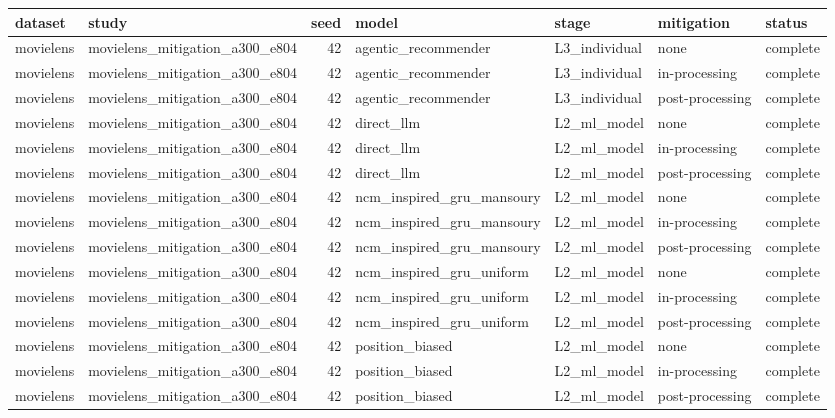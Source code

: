 \begin{table}[htbp!]
\centering
\small
\setlength{\tabcolsep}{3pt}
\renewcommand{\arraystretch}{1.1}
\begin{tabular}{llrllll}
\hline
dataset & study & seed & model & stage & mitigation & status \\
\hline
movielens & movielens\_mitigation\_a300\_e804 & 42 & agentic\_recommender & L3\_individual & none & complete \\
movielens & movielens\_mitigation\_a300\_e804 & 42 & agentic\_recommender & L3\_individual & in-processing & complete \\
movielens & movielens\_mitigation\_a300\_e804 & 42 & agentic\_recommender & L3\_individual & post-processing & complete \\
movielens & movielens\_mitigation\_a300\_e804 & 42 & direct\_llm & L2\_ml\_model & none & complete \\
movielens & movielens\_mitigation\_a300\_e804 & 42 & direct\_llm & L2\_ml\_model & in-processing & complete \\
movielens & movielens\_mitigation\_a300\_e804 & 42 & direct\_llm & L2\_ml\_model & post-processing & complete \\
movielens & movielens\_mitigation\_a300\_e804 & 42 & ncm\_inspired\_gru\_mansoury & L2\_ml\_model & none & complete \\
movielens & movielens\_mitigation\_a300\_e804 & 42 & ncm\_inspired\_gru\_mansoury & L2\_ml\_model & in-processing & complete \\
movielens & movielens\_mitigation\_a300\_e804 & 42 & ncm\_inspired\_gru\_mansoury & L2\_ml\_model & post-processing & complete \\
movielens & movielens\_mitigation\_a300\_e804 & 42 & ncm\_inspired\_gru\_uniform & L2\_ml\_model & none & complete \\
movielens & movielens\_mitigation\_a300\_e804 & 42 & ncm\_inspired\_gru\_uniform & L2\_ml\_model & in-processing & complete \\
movielens & movielens\_mitigation\_a300\_e804 & 42 & ncm\_inspired\_gru\_uniform & L2\_ml\_model & post-processing & complete \\
movielens & movielens\_mitigation\_a300\_e804 & 42 & position\_biased & L2\_ml\_model & none & complete \\
movielens & movielens\_mitigation\_a300\_e804 & 42 & position\_biased & L2\_ml\_model & in-processing & complete \\
movielens & movielens\_mitigation\_a300\_e804 & 42 & position\_biased & L2\_ml\_model & post-processing & complete \\

\end{tabular}
\end{table}
